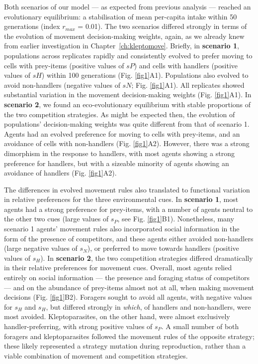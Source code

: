     Both scenarios of our model --- as expected from previous analysis --- reached an evolutionary equilibrium: a stabilisation of mean per-capita intake within 50 generations (index $r_{max}$ = 0.01).
    The two scenarios differed strongly in terms of the evolution of movement decision-making weights, again, as we already knew from earlier investigation in Chapter~\ref{ch:kleptomove}.
    Briefly, in \textbf{scenario 1}, populations across replicates rapidly and consistently evolved to prefer moving to cells with prey-items (positive values of $sP$) and cells with handlers (positive values of $sH$) within 100 generations (Fig. \ref{fig1}A1).
    Populations also evolved to avoid non-handlers (negative values of $sN$; Fig. \ref{fig1}A1).
    All replicates showed substantial variation in the movement decision-making weights (Fig. \ref{fig1}A1).
    In \textbf{scenario 2}, we found an eco-evolutionary equilibrium with stable proportions of the two competition strategies.
    As might be expected then, the evolution of populations' decision-making weights was quite different from that of scenario 1.
    Agents had an evolved preference for moving to cells with prey-items, and an avoidance of cells with non-handlers (Fig. \ref{fig1}A2).
    However, there was a strong dimorphism in the response to handlers, with most agents showing a strong preference for handlers, but with a sizeable minority of agents showing an avoidance of handlers (Fig. \ref{fig1}A2).
    
    The differences in evolved movement rules also translated to functional variation in relative preferences for the three environmental cues.
    In \textbf{scenario 1}, most agents had a strong preference for prey-items, with a number of agents neutral to the other two cues (large values of $s_P$, see Fig. \ref{fig1}B1).
    Nonetheless, many scenario 1 agents' movement rules also incorporated social information in the form of the presence of competitors, and these agents either avoided non-handlers (large negative values of $s_N$), or preferred to move towards handlers (positive values of $s_H$).
    In \textbf{scenario 2}, the two competition strategies differed dramatically in their relative preferences for movement cues.
    Overall, most agents relied entirely on social information --- the presence and foraging status of competitors --- and on the abundance of prey-items almost not at all, when making movement decisions (Fig. \ref{fig1}B2).
    Foragers sought to avoid all agents, with negative values for $s_H$ and $s_H$, but differed strongly in \textit{which}, of handlers and non-handlers, were most avoided.
    Kleptoparasites, on the other hand, were almost exclusively handler-preferring, with strong positive values of $s_P$.
    A small number of both foragers and kleptoparasites followed the movement rules of the opposite strategy; these likely represented a strategy mutation during reproduction, rather than a viable combination of movement and competition strategies.
    
